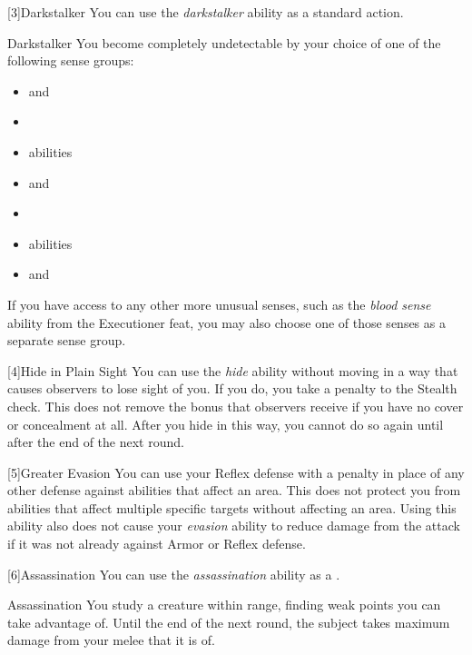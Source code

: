         [3]{Darkstalker} You can use the \textit{darkstalker} ability as a standard action.
        \begin{attuneability}{Darkstalker}
            \rankline
            You become completely undetectable by your choice of one of the following sense groups:
            \begin{itemize}
                \item {} and 
                \item {}
                \item {} abilities
                \item {} and 
                \item {}
                \item {} abilities
                \item {} and 
            \end{itemize}
            If you have access to any other more unusual senses, such as the \textit{blood sense} ability from the Executioner feat, you may also choose one of those senses as a separate sense group.
        \end{attuneability}

        [4]{Hide in Plain Sight}
        You can use the \textit{hide} ability without moving in a way that causes observers to lose sight of you.
        If you do, you take a  penalty to the Stealth check.
        This does not remove the bonus that observers receive if you have no cover or concealment at all.
        After you hide in this way, you cannot do so again until after the end of the next round.

        [5]{Greater Evasion} You can use your Reflex defense with a  penalty in place of any other defense against abilities that affect an area.
        This does not protect you from abilities that affect multiple specific targets without affecting an area.
        Using this ability also does not cause your \textit{evasion} ability to reduce damage from the attack if it was not already against Armor or Reflex defense.

        [6]{Assassination} You can use the \textit{assassination} ability as a .
        \begin{durationability}{Assassination}
            \rankline
            You study a creature within \rngmed range, finding weak points you can take advantage of.
            Until the end of the next round, the subject takes maximum damage from your melee  that it is \unaware of.
        \end{durationability}

